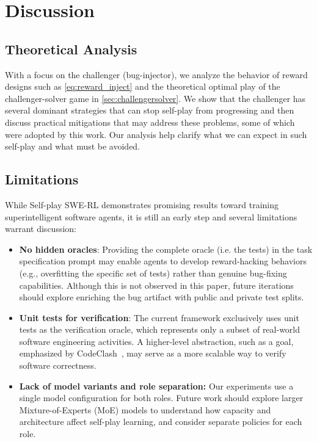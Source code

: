 \section{Discussion}

\label{section:discussion}

\subsection{Theoretical Analysis}

With a focus on the challenger (bug-injector), we analyze the behavior of reward designs such as \cref{eq:reward_inject} and the theoretical optimal play of the challenger-solver game
in \cref{sec:challengersolver}. We show that the challenger has several dominant strategies that can stop self-play from progressing and then discuss practical mitigations that may address these problems, some of which were adopted by this work. Our analysis help clarify what we can expect in such self-play and what must be avoided. 

\subsection{Limitations}

While Self-play SWE-RL demonstrates promising results toward training superintelligent software agents, it is still an early step and several limitations warrant discussion:
\begin{itemize}
\item \textbf{No hidden oracles}: Providing the complete oracle (i.e. the tests) in the task specification prompt may enable agents to develop reward-hacking behaviors (e.g., overfitting the specific set of tests) rather than genuine bug-fixing capabilities. Although this is not observed in this paper, future iterations should explore enriching the bug artifact with public and private test splits.
\item \textbf{Unit tests for verification}: The current framework exclusively uses unit tests as the verification oracle, which represents only a subset of real-world software engineering activities. A higher-level abstraction, such as a goal, emphasized by CodeClash~\cite{yang2025codeclashbenchmarkinggoalorientedsoftware}, may serve as a more scalable way to verify software correctness.
\item \textbf{Lack of model variants and role separation:} Our experiments use a single model configuration for both roles. Future work should explore larger Mixture-of-Experts (MoE) models to understand how capacity and architecture affect self-play learning, and consider separate policies for each role.
\end{itemize}

